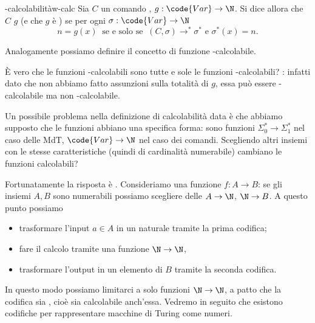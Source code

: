 \begin{definition}
    {-calcolabilità}{w-calc}
    Sia $C$ un comando , $g : \code{Var} \to \N$. 
    Si dice allora che $C$  $g$ (e che $g$ è ) se per ogni $\sigma : \code{Var} \to \N$ \[
        n = g(x) \;\;\text{se e solo se}\;\; (C, \sigma) \to^\ast \sigma^\ast \text{ e } \sigma^\ast(x) = n.
    \]   
\end{definition}

Analogamente possiamo definire il concetto di funzione -calcolabile.

È vero che le funzioni -calcolabili sono tutte e sole le funzioni -calcolabili? : infatti dato che non abbiamo fatto assunzioni sulla totalità di $g$, essa può essere -calcolabile ma non -calcolabile.

Un possibile problema nella definizione di calcolabilità data è che abbiamo supposto che le funzioni abbiano una specifica forma: sono funzioni $\Sigma_0^\ast \to \Sigma_1^\ast$ nel caso delle MdT, $\code{Var} \to \N$ nel caso dei comandi. Scegliendo altri insiemi con le stesse caratteristiche (quindi di cardinalità numerabile) cambiano le funzioni calcolabili?

Fortunatamente la risposta è . Consideriamo una funzione $f : A \to B$: se gli insiemi $A, B$ sono numerabili possiamo scegliere delle  $A \to \N$, $\N \to B$. A questo punto possiamo \begin{itemize}
    \item trasformare l'input $a \in A$ in un naturale tramite la prima codifica;
    \item fare il calcolo tramite una funzione $\N \to \N$,
    \item trasformare l'output in un elemento di $B$ tramite la seconda codifica. 
\end{itemize}

In questo modo possiamo limitarci a solo funzioni $\N \to \N$, a patto che la codifica sia , cioè sia calcolabile anch'essa. Vedremo in seguito che esistono codifiche per rappresentare macchine di Turing come numeri.